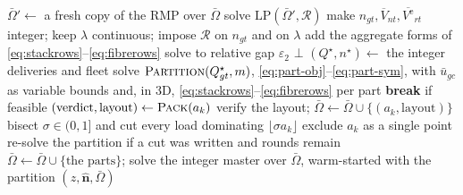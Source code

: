 \begin{algorithm}[!htb]
\caption{$\textsc{Construct}(\bar\Omega,\mathcal{R})$ --- the flow-first
relax and fix. Lines 9--14 run under 3D loading only. $\varepsilon_{2}$
is step~2's relative MIP gap and \emph{tol} the tolerance above which
artificial slack means the region admits no plan over this pool.}
\label{alg:construct}
\begin{algorithmic}[1]
\State $\bar\Omega'\gets$ a fresh copy of the RMP over $\bar\Omega$
\State solve $\mathrm{LP}(\bar\Omega',\mathcal{R})$
\State make $n_{gt},\overline{V}_{nt},\overline{V^{\mathrm{e}}}_{rt}$ integer;
   keep $\lambda$ continuous; impose $\mathcal{R}$ on $n_{gt}$ and on $\lambda$
\State add the aggregate forms of \eqref{eq:stackrows}--\eqref{eq:fibrerows}
\State solve to relative gap $\varepsilon_{2}$
   \State \Return $\bot$  \EndIf
\State $(Q^{\star},n^{\star})\gets$ the integer deliveries and fleet
      \State solve $\textsc{Partition}(Q^{\star}_{gt},m)$,
             \eqref{eq:part-obj}--\eqref{eq:part-sym}, with $\bar u_{gc}$ as
             variable bounds and, in 3D,
             \eqref{eq:stackrows}--\eqref{eq:fibrerows} per part
      \State \textbf{break} if feasible
   \EndFor
      \State $(\text{verdict},\text{layout})\gets\textsc{Pack}(a_{k})$
       \State verify the layout;
          $\bar\Omega\gets\bar\Omega\cup\{(a_{k},\text{layout})\}$ \EndIf
       \State bisect $\sigma\in(0,1]$ and cut
          every load dominating $\lfloor\sigma a_{k}\rfloor$
           \EndIf
       \State exclude $a_{k}$ as a single point
           \EndIf
   \EndFor
   \State re-solve the partition if a cut was written and rounds remain
\EndFor
\State $\bar\Omega\gets\bar\Omega\cup\{\text{the parts}\}$; solve the integer
   master over $\bar\Omega$, warm-started with the partition
\State \Return $(z,\hat{\mathbf{n}},\bar\Omega)$
\end{algorithmic}
\end{algorithm}
